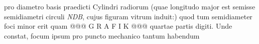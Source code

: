                      pro diametro basis praedicti Cylindri  radiorum (quae longitudo major est semisse semidiametri circuli \textit{NDB}, cujus figuram vitrum induit:) quod tum semidiameter  foci minor erit quam @@@ G R A F I K @@@%
                     quartae partis digiti. Unde  constat, focum ipsum pro puncto mechanico\protect{} tantum habendum 